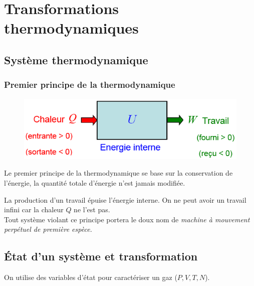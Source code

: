 \documentclass	[11pt, a4paper, openany]{book}
\begin{document}
\section{Transformations thermodynamiques}
\subsection{Système thermodynamique}
\subsubsection{Premier principe de la thermodynamique}
\begin{figure}
	\includegraphics[scale=0.4]{th/image9.png}
\end{figure}
Le premier principe de la thermodynamique se base sur la conservation de l'énergie, la quantité totale d'énergie n'est jamais modifiée.\\
\begin{center}
\end{center}
La production d'un travail épuise l'énergie interne. On ne peut avoir un travail infini car la chaleur $Q$ ne l'est pas.\\
Tout système violant ce principe portera le doux nom de \textit{machine à mouvement perpétuel de première espèce.}

\subsection{État d'un système et transformation}
On utilise des variables d'état pour caractériser un gaz ($P, V, T, N$).
\end{document}
